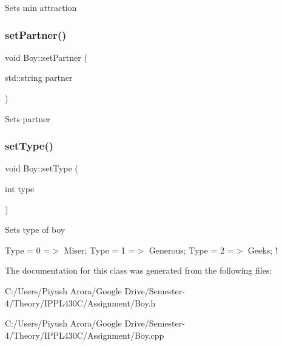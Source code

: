 Sets min attraction \mbox{\label{class_boy_a1762597ae2a5423ccb1583893b6622f6}} 
\subsubsection{\texorpdfstring{set\+Partner()}{setPartner()}}
{\footnotesize\ttfamily void Boy\+::set\+Partner (\begin{DoxyParamCaption}\item[{std\+::string}]{partner }\end{DoxyParamCaption})}

Sets partner \mbox{\label{class_boy_a7936f0d137ab929e118043a80067e43e}} 
\subsubsection{\texorpdfstring{set\+Type()}{setType()}}
{\footnotesize\ttfamily void Boy\+::set\+Type (\begin{DoxyParamCaption}\item[{int}]{type }\end{DoxyParamCaption})}

Sets type of boy

Type = 0 =$>$ Miser; Type = 1 =$>$ Generous; Type = 2 =$>$ Geeks; ! 

The documentation for this class was generated from the following files\+:\begin{DoxyCompactItemize}
\item 
C\+:/\+Users/\+Piyush Arora/\+Google Drive/\+Semester-\/4/\+Theory/\+I\+P\+P\+L430\+C/\+Assignment/Boy.\+h\item 
C\+:/\+Users/\+Piyush Arora/\+Google Drive/\+Semester-\/4/\+Theory/\+I\+P\+P\+L430\+C/\+Assignment/Boy.\+cpp\end{DoxyCompactItemize}

